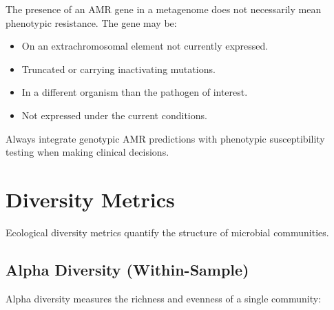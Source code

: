 \begin{warningbox}[title={AMR Gene Detection vs.\ Phenotypic Resistance}]
The presence of an AMR gene in a metagenome does not necessarily mean phenotypic resistance. The gene may be:
\begin{itemize}[nosep]
  \item On an extrachromosomal element not currently expressed.
  \item Truncated or carrying inactivating mutations.
  \item In a different organism than the pathogen of interest.
  \item Not expressed under the current conditions.
\end{itemize}
Always integrate genotypic AMR predictions with phenotypic susceptibility testing when making clinical decisions.
\end{warningbox}

\section{Diversity Metrics}
\label{sec:diversity}

Ecological diversity metrics quantify the structure of microbial communities.

\subsection{Alpha Diversity (Within-Sample)}

Alpha diversity measures the richness and evenness of a single community:

